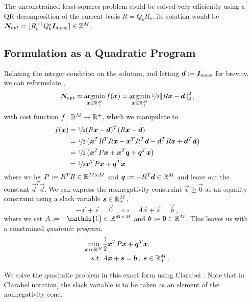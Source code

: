 \documentclass[USenglish,twocolumn]{article}
\begin{document}
  The unconstrained least-squares problem could be solved very efficiently using a QR-decomposition of the current basis $R = Q_b R_b$, its solution would be $\vec{N}_{opt} = \lfloor R_b\inv Q_b^* \vec{I}_{\rm meas} \rceil \in \Z^M$.

  \subsection{Formulation as a Quadratic Program}
  Relaxing the integer condition on the solution, and letting $\vec{d} := \vec{I}_{\rm meas}$ for brevity, we can reformulate ,
  $$\vec{N}_{\rm opt} \approx \argmin_{\vec{x} \in \R_+^M} f(\vec{x}) = \argmin_{\vec{x} \in \R_+^M} \sfrac{1}{2} \norm{R \vec{x} - \vec{d}}_2^2\,,$$
  with cost function $f: \R^M \to \R^+$, which we manipulate to
  \begin{align*}
    f(\vec{x}) & = \sfrac{1}{2} (R \vec{x} - \vec{d})^T (R \vec{x} - \vec{d})                                                          \\
               & = \sfrac{1}{2} \left(\vec{x}^T R^T R \vec{x} - \vec{x}^T R^T \vec{d} - \vec{d}^T R \vec{x} + \vec{d}^T \vec{d}\right) \\
               & = \sfrac{1}{2} \left(\vec{x}^T P \vec{x} + \vec{x}^T \vec{q} + \vec{q}^T \vec{x}\right)                               \\
               & = \sfrac{1}{2} \vec{x}^T P \vec{x} + \vec{q}^T \vec{x}
  \end{align*}
  where we let $P := R^T R \in \R^{M \times M}$ and $\vec{q} := -R^T \vec{d} \in \R^M$ and leave out the constant $\vec{d}^T \vec{d}$.
  We can express the nonnegativity constraint $\vec{x} \ge \vec{0}$ as an equality constraint using a slack variable $\vec{s} \in \R_+^M$,
  $$-\vec{x} + \vec{s} = \vec{0} \quad\Leftrightarrow\quad A \vec{x} + \vec{s} = \vec{b}\,,$$
  where we set $A := -\mathds{1} \in \R^{M \times M}$ and $\vec{b} := \vec{0} \in \R^M$.
  This leaves us with a constrained \textit{quadratic program},
  \begin{align}
    \min_{\vec{x} in \R^M} & \frac{1}{2} \vec{x}^T P \vec{x} + \vec{q}^T \vec{x},     \\
    s.t.\;                 & A \vec{x} + \vec{s} = \vec{b}\,,\; \vec{s} \in \R_+^M\,.
  \end{align}

  We solve the quadratic problem in this exact form using Clarabel \cite{2024-clarabel}.
  Note that in Clarabel notation, the slack variable is to be taken as an element of the nonnegativity cone.
\end{document}
